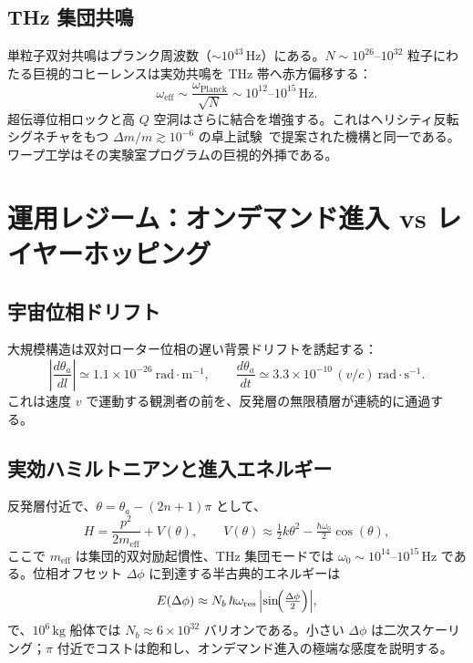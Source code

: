\documentclass[dvipdfmx,a4paper]{article}
\theoremstyle{definition}
\begin{document}
\subsection{THz 集団共鳴}

単粒子双対共鳴はプランク周波数（$\sim 10^{43}\,\mathrm{Hz}$）にある。$N\sim 10^{26}$--$10^{32}$ 粒子にわたる巨視的コヒーレンスは実効共鳴を THz 帯へ赤方偏移する：
\begin{equation}
\omega_{\mathrm{eff}} \sim \frac{\omega_{\mathrm{Planck}}}{\sqrt{N}} \sim 10^{12}\text{--}10^{15}\,\mathrm{Hz}.
\label{eq:freq-redshift}
\end{equation}
超伝導位相ロックと高 $Q$ 空洞はさらに結合を増強する。これはヘリシティ反転シグネチャをもつ $\Delta m/m\gtrsim 10^{-6}$ の卓上試験~\cite{dual2025}で提案された機構と同一である。ワープ工学はその実験室プログラムの巨視的外挿である。

\section{運用レジーム：オンデマンド進入 vs レイヤーホッピング}
\label{sec:operational}

\subsection{宇宙位相ドリフト}

大規模構造は双対ローター位相の遅い背景ドリフトを誘起する：
\begin{equation}
\left|\frac{d\theta_a}{dl}\right| \simeq 1.1\times 10^{-26}~\mathrm{rad\cdot m^{-1}},
\qquad
\frac{d\theta_a}{dt} \simeq 3.3\times 10^{-10}\,(v/c)~\mathrm{rad\cdot s^{-1}}.
\label{eq:drift}
\end{equation}
これは速度 $v$ で運動する観測者の前を、反発層の無限積層が連続的に通過する。

\subsection{実効ハミルトニアンと進入エネルギー}

反発層付近で、$\theta=\theta_a-(2n+1)\pi$ として、
\begin{equation}
H = \frac{p^2}{2m_{\mathrm{eff}}} + V(\theta),
\qquad
V(\theta) \approx \tfrac{1}{2}k\theta^2 - \tfrac{\hbar\omega_0}{2}\cos(\theta),
\label{eq:hamiltonian}
\end{equation}
ここで $m_{\mathrm{eff}}$ は集団的双対励起慣性、THz 集団モードでは $\omega_0\sim 10^{14}$--$10^{15}\,\mathrm{Hz}$ である。位相オフセット $\Delta\phi$ に到達する半古典的エネルギーは
\begin{equation}
E(\Delta\phi) \approx N_b\,\hbar\omega_{\mathrm{res}}\,\Bigl|\sin\!\Bigl(\tfrac{\Delta\phi}{2}\Bigr)\Bigr|,
\label{eq:energy}
\end{equation}
で、$10^6\,\mathrm{kg}$ 船体では $N_b\approx 6\times 10^{32}$ バリオンである。小さい $\Delta\phi$ は二次スケーリング；$\pi$ 付近でコストは飽和し、オンデマンド進入の極端な感度を説明する。
\end{document}
